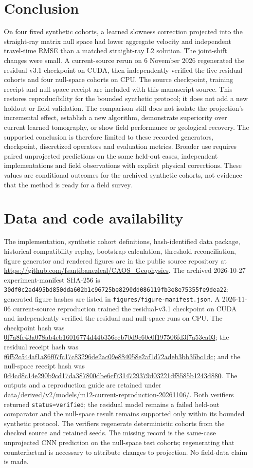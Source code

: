 \documentclass[11pt]{article}
\newcounter{algorithm}
\begin{document}
\section{Conclusion}
On four fixed synthetic cohorts, a learned slowness correction projected into the straight-ray matrix null space had lower aggregate velocity and independent travel-time RMSE than a matched straight-ray L2 solution. The joint-shift changes were small. A current-source rerun on 6 November 2026 regenerated the residual-v3.1 checkpoint on CUDA, then independently verified the five residual cohorts and four null-space cohorts on CPU. The source checkpoint, training receipt and null-space receipt are included with this manuscript source. This restores reproducibility for the bounded synthetic protocol; it does not add a new holdout or field validation. The comparison still does not isolate the projection's incremental effect, establish a new algorithm, demonstrate superiority over current learned tomography, or show field performance or geological recovery. The supported conclusion is therefore limited to these recorded generators, checkpoint, discretized operators and evaluation metrics. Broader use requires paired unprojected predictions on the same held-out cases, independent implementations and field observations with explicit physical corrections. These values are conditional outcomes for the archived synthetic cohorts, not evidence that the method is ready for a field survey.

\section*{Data and code availability}
The implementation, synthetic cohort definitions, hash-identified data package, historical compatibility replay, bootstrap calculation, threshold reconciliation, figure generator and rendered figures are in the public source repository at \url{https://github.com/fsantibanezleal/CAOS_Geophysics}. The archived 2026-10-27 experiment-manifest SHA-256 is \texttt{30df0c2ad495bd850dda602b1c96725be8290dd086119fb3e8e75355fe9dea22}; generated figure hashes are listed in \texttt{figures/figure-manifest.json}. A 2026-11-06 current-source reproduction trained the residual-v3.1 checkpoint on CUDA and independently verified the residual and null-space runs on CPU. The checkpoint hash was \url{0f7a8fc43a078ab4cb16016774d44b356ccb70d9c60e0f197506fd3f7a53ea03}; the residual receipt hash was \url{f6f52c544af1a86f07fc17c83296de2ac09e884058e2af1d72adeb3bb35bc1dc}; and the null-space receipt hash was \url{0d4cd8c14e290b9cd17da387800dbe6cf7314729379d03221df8585b1243d880}. The outputs and a reproduction guide are retained under \url{data/derived/v2/models/m12-current-reproduction-20261106/}. Both verifiers returned \texttt{status=verified}; the residual model remains a failed held-out comparator and the null-space result remains supported only within its bounded synthetic protocol. The verifiers regenerate deterministic cohorts from the checked source and retained seeds. The missing record is the same-case unprojected CNN prediction on the null-space test cohorts; regenerating that counterfactual is necessary to attribute changes to projection. No field-data claim is made.
\end{document}
